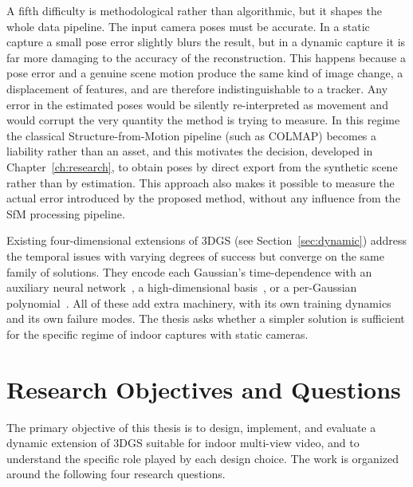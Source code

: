 A fifth difficulty is methodological rather than algorithmic, but it shapes the
whole data pipeline. The input camera poses must be accurate. In a static
capture a small pose error slightly blurs the result, but in a dynamic capture
it is far more damaging to the accuracy of the reconstruction. This happens
because a pose error and a genuine scene motion produce the same kind of image
change, a displacement of features, and are therefore indistinguishable to a
tracker. Any error in the estimated poses would be silently re-interpreted as
movement and would corrupt the very quantity the method is trying to measure.
In this regime the classical Structure-from-Motion pipeline (such as COLMAP)
becomes a liability rather than an asset, and this motivates the decision, developed in Chapter~\ref{ch:research}, to obtain poses
by direct export from the synthetic scene rather than by estimation. This
approach also makes it possible to measure the actual error introduced by the
proposed method, without any influence from the SfM processing pipeline.

Existing four-dimensional extensions of 3DGS (see Section~\ref{sec:dynamic})
address the temporal issues with varying degrees of success but converge on the
same family of solutions. They encode each Gaussian's time-dependence with an
auxiliary neural network~\cite{yang2024deformable}, a high-dimensional
basis~\cite{wu20244dgs}, or a per-Gaussian polynomial~\cite{li2024spacetime}.
All of these add extra machinery, with its own training dynamics and its own
failure modes. The thesis asks whether a simpler solution is
sufficient for the specific regime of indoor captures with static cameras.

\section{Research Objectives and Questions}

The primary objective of this thesis is to design, implement, and evaluate a
dynamic extension of 3DGS suitable for indoor multi-view video, and to
understand the specific role played by each design choice. The work is organized
around the following four research questions.

